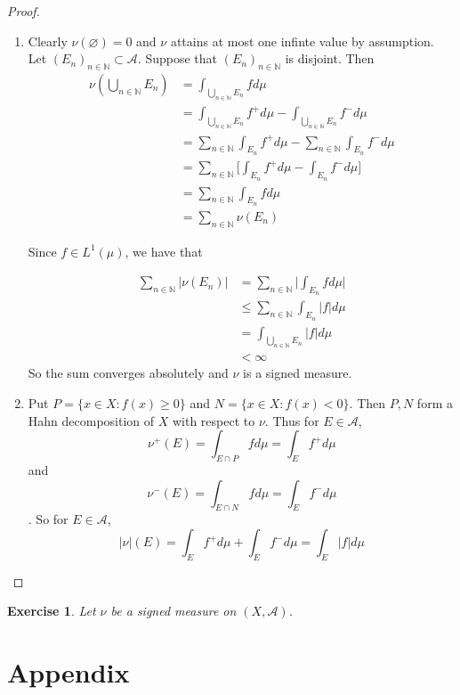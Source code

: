 \documentclass[12pt]{amsart}
\newtheorem{ex}[thm]{Exercise}
\newcommand{\N}{\mathbb{N}}
\newcommand{\MA}{\mathcal{A}}
\begin{document}
\begin{proof}

\begin{enumerate}

\item Clearly $\nu(\varnothing) = 0$ and $\nu$ attains at most one infinte value by assumption. Let $(E_n)_{n \in \N} \subset \MA$. Suppose that $(E_n)_{n \in \N}$ is disjoint. Then 
\begin{align*}
\nu(\bigcup_{n \in \N} E_n)
&= \int_{\bigcup_{n \in \N} E_n} f d \mu \\ 
&= \int_{\bigcup_{n \in \N} E_n} f^+ d \mu - \int_{\bigcup_{n \in \N} E_n} f^- d \mu\\
&= \sum_{n \in \N} \int_{ E_n} f^+ d \mu - \sum_{n \in \N} \int_{E_n} f^- d \mu\\
&= \sum_{n \in \N} \bigg[ \int_{ E_n} f^+ d \mu - \int_{ E_n} f^- d \mu \bigg]\\
&= \sum_{n \in \N} \int_{ E_n} f d \mu\\
&= \sum_{n \in \N} \nu(E_n)
\end{align*}

Since $f \in L^1(\mu)$, we have that 

\begin{align*}
\sum_{n \in \N} |\nu(E_n)|
&=  \sum_{n \in \N} \bigg|\int_{E_n} f d \mu \bigg|\\
& \leq \sum_{n \in \N} \int_{E_n} |f| d\mu\\
&= \int_{\bigcup_{n \in \N} E_n} |f| d \mu\\
& < \infty
\end{align*}
So the sum converges absolutely and $\nu$ is a signed measure. 

\item Put $P = \{x \in X: f(x) \geq 0\}$ and $N = \{x \in X: f(x) < 0\}$. Then $P,N$ form a Hahn decomposition of $X$ with respect to $\nu$. Thus for $E \in \MA$, $$\nu^+(E) = \int_{E \cap P} f d \mu = \int_E f^+ d \mu$$ and $$\nu^-(E) = \int_{E \cap N} f d \mu = \int_E f^- d \mu$$. So for $E \in \MA$, $$|\nu|(E) = \int_E f^+ d\mu + \int_E f^- d\mu = \int_E |f| d\mu$$
\end{enumerate}
\end{proof}

\begin{ex}
Let $\nu$ be a signed measure on $(X, \MA)$.
\end{ex}

\section{Appendix}
\end{document}
